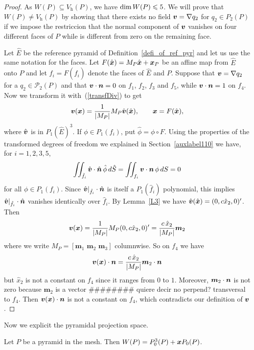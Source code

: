 \begin{proof}
As $W(P)\subseteq V_{\textit{h}}(P)$, we have $\mbox{dim\,}W(P)\leqslant 5$. 
We will prove that $W(P)\ne V_{\textit{h}}(P)$ by showing that there exists no field
$\boldsymbol{v}=\nabla q_2$ for $q_2\in P_2(P)$ if we impose the restriccion that the normal
component of $\boldsymbol{v}$ vanishes on four different faces of $P$ while is different from zero on
the remaining face.

Let $\hat E$ be the reference pyramid of Definition~\ref{defi_of_ref_pyr}  and
let us use the same notation for the faces. Let $F(\hat {\boldsymbol{x}}) = M_P \hat{\boldsymbol{x}} + \boldsymbol{x}_P$
be an affine map from $\hat E$ onto $P$ and let
$f_i=F(\hat f_i)$ denote the faces of $\hat E$ and $P$. Suppose
that $\boldsymbol{v}=\nabla q_2$ for a $q_2 \in \mathcal P_2(P)$ and that
$\boldsymbol{v}\cdot\boldsymbol{n}=0$ on $f_1$, $f_2$, $f_3$ and $f_5$, while
$\boldsymbol{v}\cdot\boldsymbol{n}=1$ on $f_4$. Now we transform it with~(\ref{transfDiv}) to get
\begin{equation}\label{piola}
\boldsymbol{v}({\boldsymbol{x}}) = \frac1{|M_P|}M_P\hat{\boldsymbol{v}}(\hat{\boldsymbol{x}}), \qquad {\boldsymbol{x}}=F(\hat {\boldsymbol{x}}),
\end{equation}
where $\hat{\boldsymbol{v}}$ is in $P_1(\hat E)^3$. If $\phi\in P_1(f_i)$, put $\hat\phi = \phi\circ F$.
Using the properties of the transformed
degrees of freedom we explained in Section~\ref{auxlabel110} we have, for $i=1,2,3,5$,
\[
\iint_{\hat f_i}\hat{\boldsymbol{v}}\cdot {\hat{\boldsymbol{n}}}\,\hat\phi\,d\hat S = \iint_{f_i}\boldsymbol{v}\cdot {\boldsymbol{n}}\,\phi\,dS =0
\]
for all $\phi\in P_1(f_i)$.
Since $\hat{\boldsymbol{v}}|_{\hat f_i}\cdot {\hat{\boldsymbol{n}}}$ is itself a $P_1(\hat f_i)$ polynomial, 
this implies $\hat{\boldsymbol{v}}|_{\hat f_i}\cdot {\hat{\boldsymbol{n}}}$ vanishes identically over $\hat f_i$.
By Lemma~\ref{L3} we have $\hat{\boldsymbol{v}}(\hat{\boldsymbol{x}})=(0,c\hat x_2,0)'$. Then
\[
  \boldsymbol{v}({\boldsymbol{x}})=\frac1{|M_P|}M_P(0,c\hat x_2,0)' = \frac {c\,\hat x_2}{|M_P|}\boldsymbol{m}_2 
\]
where we write $M_P=[\boldsymbol{m}_1\,\,\boldsymbol{m}_2\,\,\boldsymbol{m}_3]$ 
columnwise. So on $f_4$ we have 
\[
	\boldsymbol{v}({\boldsymbol{x}})\cdot {\boldsymbol{n}}=\frac {c\,\hat x_2}{|M_P|}\boldsymbol{m}_2\cdot {\boldsymbol{n}} 
\]
but $\hat x_2$ is not a constant on $f_4$ since it ranges from $0$ to $1$. Moreover,
$\boldsymbol{m}_2\cdot {\boldsymbol{n}}$ is not zero because $\boldsymbol{m}_2$ is a 
vector {\color{Orange}\#\#\#\#\#\#\#\# quiere decir no perpend? transversal} to $f_4$.
Then $\boldsymbol{v}({\boldsymbol{x}})\cdot {\boldsymbol{n}}$ is not a constant on $f_4$, which contradicts our 
definition of $\boldsymbol{v}$.  
\end{proof}
Now we explicit the pyramidal projection space.
\begin{proposition}
Let $P$ be a pyramid in the mesh. Then $W(P)=P_0^3(P)+{\boldsymbol{x}} P_0(P)$.
\end{proposition}
